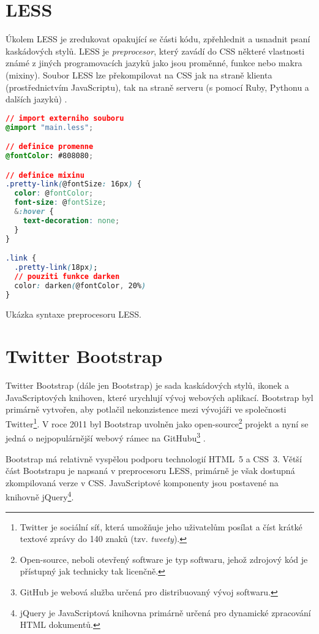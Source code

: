 \section{LESS}
\label{sec:less}

Úkolem LESS je zredukovat opakující se části kódu, zpřehlednit a usnadnit psaní kaskádových stylů. LESS je \textit{preprocesor}, který zavádí do CSS některé vlastnosti známé z jiných programovacích jazyků jako jsou proměnné, funkce nebo makra (mixiny). Soubor LESS lze překompilovat na CSS jak na straně klienta (prostřednictvím JavaScriptu), tak na straně serveru (s pomocí Ruby, Pythonu a dalších jazyků) \cite{18}.

\begin{example}
    \centering
    \begin{lstlisting}[language=css]
// import externiho souboru
@import "main.less";

// definice promenne
@fontColor: #808080;

// definice mixinu
.pretty-link(@fontSize: 16px) {
  color: @fontColor;
  font-size: @fontSize;
  &:hover {
    text-decoration: none;
  }
}

.link {
  .pretty-link(18px);
  // pouziti funkce darken
  color: darken(@fontColor, 20%)
}
    \end{lstlisting}
    \caption{Ukázka syntaxe preprocesoru LESS.}
    \label{example:less-css}
\end{example}

\section{Twitter Bootstrap}
\label{sec:bootstrap}

Twitter Bootstrap (dále jen Bootstrap) je sada kaskádových stylů, ikonek a JavaScriptových knihoven, které urychlují vývoj webových aplikací. Bootstrap byl primárně vytvořen, aby potlačil nekonzistence mezi vývojáři ve společnosti Twitter\footnote{Twitter je sociální síť, která umožňuje jeho uživatelům posílat a číst krátké textové zprávy do 140 znaků (tzv. \textit{tweety}).}. V roce 2011 byl Bootstrap uvolněn jako open-source\footnote{Open-source, neboli otevřený software je typ softwaru, jehož zdrojový kód je přístupný jak technicky tak licenčně.} projekt a nyní se jedná o nejpopulárnější webový rámec na GitHubu\footnote{GitHub je webová služba určená pro distribuovaný vývoj softwaru.} \cite{19}.

Bootstrap má relativně vyspělou podporu technologií HTML~5 a CSS~3. Větší část Bootstrapu je napsaná v preprocesoru LESS, primárně je však dostupná zkompilovaná verze v CSS. JavaScriptové komponenty jsou postavené na knihovně jQuery\footnote{jQuery je JavaScriptová knihovna primárně určená pro dynamické zpracování HTML dokumentů.}.


